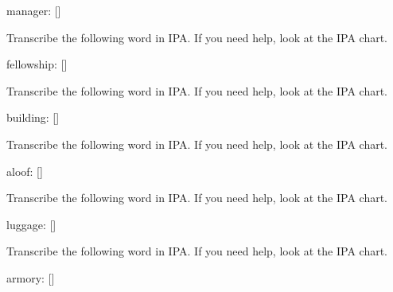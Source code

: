 \documentclass[12pt,a4paper,article]{memoir} %
\begin{document}
\begin{enumerate}
{{\normalfont manager: [\underline{\hspace{1cm}}]}

\vspace{0.5cm}

\makebox[\linewidth]{\rule{\paperwidth}{0.4pt}}

\vspace{0.5cm}

\item Transcribe the following word in IPA. If you need help, look at the IPA chart.

{\normalfont fellowship: [\underline{\hspace{1cm}}]}

\vspace{0.5cm}

\makebox[\linewidth]{\rule{\paperwidth}{0.4pt}}

\vspace{0.5cm}

\item Transcribe the following word in IPA. If you need help, look at the IPA chart.

{\normalfont building: [\underline{\hspace{1cm}}]}

\vspace{0.5cm}

\makebox[\linewidth]{\rule{\paperwidth}{0.4pt}}

\vspace{0.5cm}

\item Transcribe the following word in IPA. If you need help, look at the IPA chart.

{\normalfont aloof: [\underline{\hspace{1cm}}]}

\vspace{0.5cm}

\makebox[\linewidth]{\rule{\paperwidth}{0.4pt}}

\vspace{0.5cm}

\item Transcribe the following word in IPA. If you need help, look at the IPA chart.

{\normalfont luggage: [\underline{\hspace{1cm}}]}

\vspace{0.5cm}

\makebox[\linewidth]{\rule{\paperwidth}{0.4pt}}

\vspace{0.5cm}

\item Transcribe the following word in IPA. If you need help, look at the IPA chart.

{\normalfont armory: [\underline{\hspace{1cm}}]}

\vspace{0.5cm}

\makebox[\linewidth]{\rule{\paperwidth}{0.4pt}}

\vspace{0.5cm}

}
\end{enumerate}
\end{document}
